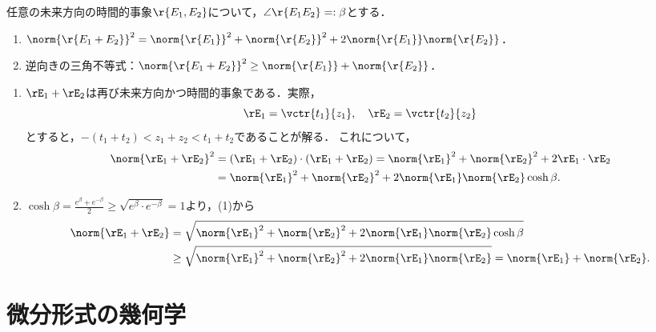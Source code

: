 \documentclass[uplatex,dvipdfmx]{jsreport}
\begin{document}
\begin{corollary}[逆向きの三角不等式]
    任意の未来方向の時間的事象$\r{E_1,E_2}$について，$\angle\r{E_1E_2}=:\beta$とする．
    \begin{enumerate}
        \item $\norm{\r{E_1+E_2}}^2=\norm{\r{E_1}}^2+\norm{\r{E_2}}^2+2\norm{\r{E_1}}\norm{\r{E_2}}$．
        \item 逆向きの三角不等式：$\norm{\r{E_1+E_2}}^2\ge\norm{\r{E_1}}+\norm{\r{E_2}}$．
    \end{enumerate}
\end{corollary}
\begin{Proof}\mbox{}
    \begin{enumerate}
        \item $\rE_1+\rE_2$は再び未来方向かつ時間的事象である．実際，
        \[\rE_1=\vctr{t_1}{z_1},\quad\rE_2=\vctr{t_2}{z_2}\]
        とすると，$-(t_1+t_2)<z_1+z_2<t_1+t_2$であることが解る．
        これについて，
        \begin{align*}
            \norm{\rE_1+\rE_2}^2&=(\rE_1+\rE_2)\cdot(\rE_1+\rE_2)=\norm{\rE_1}^2+\norm{\rE_2}^2+2\rE_1\cdot\rE_2\\
            &=\norm{\rE_1}^2+\norm{\rE_2}^2+2\norm{\rE_1}\norm{\rE_2}\cosh\beta.
        \end{align*}
        \item $\cosh\beta=\frac{e^\beta+e^{-\beta}}{2}\ge\sqrt{e^\beta\cdot e^{-\beta}}=1$より，(1)から
        \begin{align*}
            \norm{\rE_1+\rE_2}&=\sqrt{\norm{\rE_1}^2+\norm{\rE_2}^2+2\norm{\rE_1}\norm{\rE_2}\cosh\beta}\\
            &\ge\sqrt{\norm{\rE_1}^2+\norm{\rE_2}^2+2\norm{\rE_1}\norm{\rE_2}}=\norm{\rE_1}+\norm{\rE_2}.
        \end{align*}
    \end{enumerate}
\end{Proof}

\chapter{微分形式の幾何学}
\end{document}
